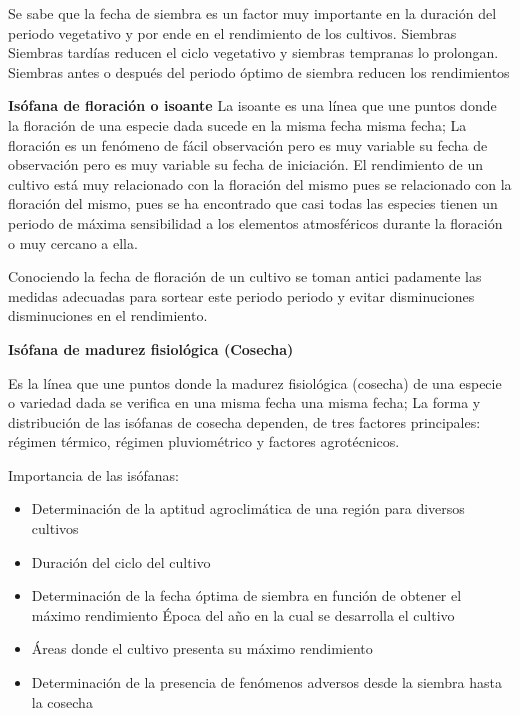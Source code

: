 Se sabe que la fecha de siembra es un factor muy importante en la duración del periodo vegetativo y por ende en el rendimiento de los cultivos. Siembras Siembras tardías reducen el ciclo vegetativo y siembras tempranas lo prolongan. Siembras antes o después del periodo óptimo de siembra reducen los rendimientos

\textbf{Isófana de floración o isoante}
La isoante es una línea que une puntos donde la floración de una especie dada sucede en la misma fecha misma fecha; La floración es un fenómeno de fácil observación pero es muy variable su fecha de observación pero es muy variable su fecha de iniciación. El rendimiento de un cultivo está muy relacionado con la floración del mismo pues se relacionado con la floración del mismo, pues se ha encontrado que casi todas las especies tienen un periodo de máxima sensibilidad a los elementos atmosféricos durante la floración o muy cercano a ella.

Conociendo la fecha de floración de un cultivo se toman antici padamente las medidas adecuadas para sortear este periodo periodo y evitar disminuciones disminuciones en el rendimiento.

\textbf{Isófana de madurez fisiológica (Cosecha)}

Es la línea que une puntos donde la madurez fisiológica (cosecha) de una especie o variedad dada se verifica en una misma fecha una misma fecha; La forma y distribución de las isófanas de cosecha dependen, de tres factores principales: régimen térmico, régimen pluviométrico y factores agrotécnicos.

Importancia de las isófanas:
\begin{itemize}
    \item Determinación de la aptitud agroclimática de una región para diversos cultivos
    \item Duración del ciclo del cultivo    
    \item Determinación de la fecha óptima de siembra en función de obtener el máximo rendimiento Época del año en la cual se desarrolla el cultivo
    \item Áreas donde el cultivo presenta su máximo rendimiento
    \item Determinación de la presencia de fenómenos adversos desde la siembra hasta la cosecha
\end{itemize}

